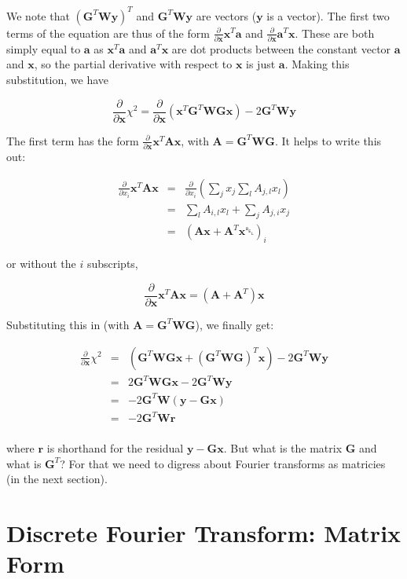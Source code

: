 \documentclass[12pt]{article}
\newcommand{\G}{\mathbf{G}}
\newcommand{\x}{\mathbf{x}}
\newcommand{\y}{\mathbf{y}}
\newcommand{\rvect}{\mathbf{r}}
\newcommand{\W}{\mathbf{W}}
\newcommand{\A}{\mathbf{A}}
\newcommand{\avec}{\mathbf{a}}
\newcommand{\ddx}{\frac{\partial}{\partial \mathbf{x}}}
\newcommand{\ddxi}{\frac{\partial}{\partial x_i}}
\begin{document}
We note that $(\G^{T} \W \y)^{T}$ and $\G^{T} \W \y$ are vectors ($\y$ is a
vector). The first two terms of the equation are thus of the form
$\ddx \x^T \avec$ and $\ddx \avec^T \x$. These are both simply equal to
$\avec$ as $\x^T \avec$ and $\avec^T \x$ are dot products between the
constant vector $\avec$ and $\x$, so the partial derivative with respect to
$\x$ is just $\avec$. Making this substitution, we have

\begin{equation}
\ddx \chi^{2} = \ddx \left( \x^{T} \G^{T} \W \G \x \right) - 2 \G^T \W \y 
\end{equation}

\noindent The first term has the form $\ddx \x^T\A\x$, with
$\A = \G^T \W \G$. It helps to write this out:

\begin{eqnarray*}
  \ddxi \x^{T}\A\x & = & \ddxi \left( \sum_{j} x_{j} \sum_l A_{j,l} x_{l}  \right) \\
                   & = & \sum_l A_{i,l} x_{l} + \sum_j A_{j,i} x_{j} \\
                   & = & \left( \A \x + \A^{T} \x␇ \right)_{i}
\end{eqnarray*}

\noindent or without the $i$ subscripts,

\begin{equation}
  \ddx \x^T\A\x = (\A + \A^T) \x
\end{equation}

\noindent Substituting this in (with $\A = \G^T \W \G$), we finally get:

\begin{eqnarray*}
\ddx \chi^{2} & = & \left( \G^T \W \G \x + (\G^T \W \G)^T \x \right)
                 - 2 \G^T \W \y \\
             & = & 2 \G^T \W \G \x - 2 \G^T \W \y \\
             & = & -2 \G^T \W ( \y - \G \x ) \\
             & = & -2 \G^T \W \rvect \\
\end{eqnarray*}

\noindent where $\rvect$ is shorthand for the residual
$\y - \G \x$. But what is the matrix $\G$ and what is $\G^T$?
For that we need to digress about
Fourier transforms as matricies (in the next section).

\section{Discrete Fourier Transform: Matrix Form}
\end{document}
